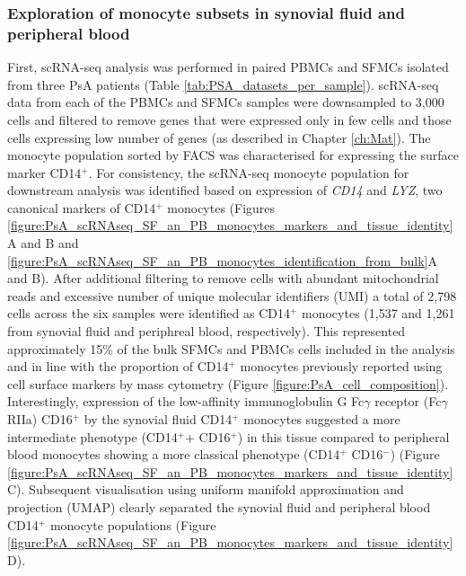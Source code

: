 \subsubsection{Exploration of monocyte subsets in synovial fluid and peripheral blood}
First, scRNA-seq analysis was performed in paired PBMCs and SFMCs isolated from three PsA patients (Table \ref{tab:PSA_datasets_per_sample}). scRNA-seq data from each of the PBMCs and SFMCs samples were downsampled to 3,000 cells and filtered to remove genes that were expressed only in few cells and those cells expressing low number of genes (as described in Chapter \ref{ch:Mat}). The monocyte population sorted by FACS was characterised for expressing the surface marker CD14$^+$. For consistency, the scRNA-seq monocyte population for downstream analysis was identified based on expression of \textit{CD14} and \textit{LYZ}, two canonical markers of CD14$^+$ monocytes \parencite{Zhao2009}(Figures \ref{figure:PsA_scRNAseq_SF_an_PB_monocytes_markers_and_tissue_identity}A and B and \ref{figure:PsA_scRNAseq_SF_an_PB_monocytes_identification_from_bulk}A and B). After additional filtering to remove cells with abundant mitochondrial reads and excessive number of unique molecular identifiers (UMI) a total of 2,798 cells across the six samples were identified as CD14$^+$ monocytes (1,537 and 1,261 from synovial fluid and periphreal blood, respectively). This represented approximately 15\% of the bulk SFMCs and PBMCs cells included in the analysis and in line with the proportion of CD14$^+$ monocytes previously reported using cell surface markers by mass cytometry (Figure \ref{figure:PsA_cell_composition}). Interestingly, expression of the low-affinity immunoglobulin G Fc$\gamma$ receptor (Fc$\gamma$RIIa) CD16$^+$ by the synovial fluid CD14$^+$ monocytes suggested a more intermediate phenotype (CD14$^+$+ CD16$^+$) in this tissue compared to peripheral blood monocytes showing a more classical phenotype (CD14$^+$ CD16$^-$) (Figure \ref{figure:PsA_scRNAseq_SF_an_PB_monocytes_markers_and_tissue_identity}C). Subsequent visualisation using uniform manifold approximation and projection (UMAP) clearly separated the synovial fluid and peripheral blood CD14$^+$ monocyte populations (Figure \ref{figure:PsA_scRNAseq_SF_an_PB_monocytes_markers_and_tissue_identity}D). 


